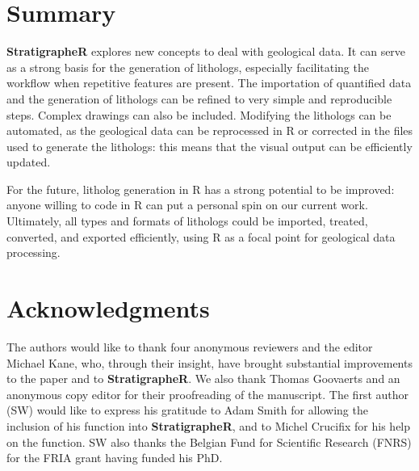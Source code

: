 \section{Summary}

\textbf{StratigrapheR} explores new concepts to deal with geological data. It can serve as a strong basis for the generation of lithologs, especially facilitating the workflow when repetitive features are present. The importation of quantified data and the generation of lithologs can be refined to very simple and reproducible steps. Complex drawings can also be included. Modifying the lithologs can be automated, as the geological data can be reprocessed in R or corrected in the files used to generate the lithologs: this means that the visual output can be efficiently updated.

For the future, litholog generation in R has a strong potential to be improved: anyone willing to code in R can put a personal spin on our current work. Ultimately, all types and formats of lithologs could be imported, treated, converted, and exported efficiently, using R as a focal point for geological data processing.

\section{Acknowledgments}

The authors would like to thank four anonymous reviewers and the editor Michael Kane, who, through their insight, have brought substantial improvements to the paper and to \textbf{StratigrapheR}. We also thank Thomas Goovaerts and an anonymous copy editor for their proofreading of the manuscript. The first author (SW) would like to express his gratitude to Adam Smith for allowing the inclusion of his  function into \textbf{StratigrapheR}, and to Michel Crucifix for his help on the  function. SW also thanks the Belgian Fund for Scientific Research (FNRS) for the FRIA grant having funded his PhD.

\newpage


\newpage
\address{Sébastien Wouters\\
  Sedimentary Petrology\\
  University of Liege\\
  Belgium\\
  \href{https://orcid.org/0000-0003-2526-0880}{ORCiD: 0000-0003-2526-0880}\\
  }

